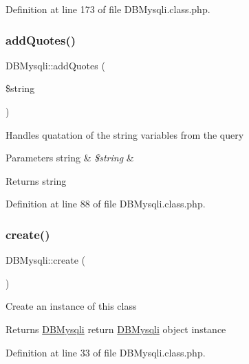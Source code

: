 Definition at line 173 of file D\+B\+Mysqli.\+class.\+php.

\mbox{\label{classDBMysqli_a29266a97d63be11763eb24926d39f544}} 
\subsubsection{\texorpdfstring{add\+Quotes()}{addQuotes()}}
{\footnotesize\ttfamily D\+B\+Mysqli\+::add\+Quotes (\begin{DoxyParamCaption}\item[{}]{\$string }\end{DoxyParamCaption})}

Handles quatation of the string variables from the query 
\begin{DoxyParams}[1]{Parameters}
string & {\em \$string} & \\
\hline
\end{DoxyParams}
\begin{DoxyReturn}{Returns}
string 
\end{DoxyReturn}


Definition at line 88 of file D\+B\+Mysqli.\+class.\+php.

\mbox{\label{classDBMysqli_a589dd45054eb50e666c3a57815631111}} 
\subsubsection{\texorpdfstring{create()}{create()}}
{\footnotesize\ttfamily D\+B\+Mysqli\+::create (\begin{DoxyParamCaption}{ }\end{DoxyParamCaption})}

Create an instance of this class \begin{DoxyReturn}{Returns}
\hyperlink{classDBMysqli}{D\+B\+Mysqli} return \hyperlink{classDBMysqli}{D\+B\+Mysqli} object instance 
\end{DoxyReturn}


Definition at line 33 of file D\+B\+Mysqli.\+class.\+php.

\mbox{\label{classDBMysqli_a9e173fea0afa5c419977be95d1859892}} 
